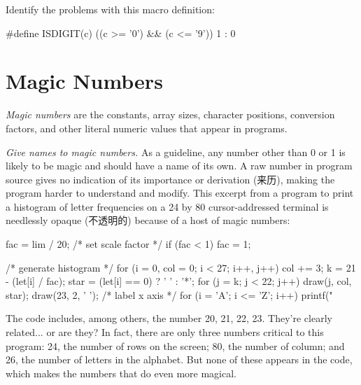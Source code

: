 \begin{exercise}
    Identify the problems with this macro definition:
    \begin{badcode}
        #define ISDIGIT(c) ((c >= '0') && (c <= '9')) 1 : 0
    \end{badcode}
\end{exercise}

\section{Magic Numbers}
\label{sec:magic_number}
\textit{Magic numbers} are the constants, array sizes, character positions,
conversion factors, and other literal numeric values that appear in programs.

\emph{Give names to magic numbers.} As a guideline, any number other than 0
or 1 is likely to be magic and should have a name of its own. A raw number
in program source gives no indication of its importance or
derivation (来历), making the program harder to understand and modify. This
excerpt from a program to print a histogram of letter frequencies on a 24
by 80 cursor-addressed terminal is needlessly opaque (不透明的) because of a
host of magic numbers:
\begin{badcode}
    fac = lim / 20;     /* set scale factor */
    if (fac < 1)
        fac = 1;

                        /* generate histogram */
    for (i = 0, col = 0; i < 27; i++, j++) {
        col += 3;
        k = 21 - (let[i] / fac);
        star = (let[i] == 0) ? ' ' : '*';
        for (j = k; j < 22; j++)
            draw(j, col, star);
    }
    draw(23, 2, ' '); /* label x axis */
    for (i = 'A'; i <= 'Z'; i++)
        printf("%
\end{badcode}
The code includes, among others, the number 20, 21, 22, 23. They're clearly
related... or are they? In fact, there are only three numbers critical to
this program: 24, the number of rows on the screen; 80, the number of
column; and 26, the number of letters in the alphabet. But none of these
appears in the code, which makes the numbers that do even more magical.

